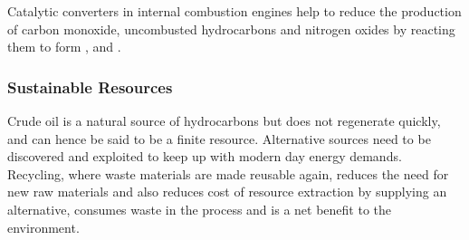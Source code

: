 \documentclass[../main]{subfiles}
\begin{document}
	Catalytic converters in internal combustion engines help to reduce the production of carbon monoxide, uncombusted hydrocarbons and nitrogen oxides by reacting them to form ,  and .

	\subsubsection{Sustainable Resources}

	Crude oil is a natural source of hydrocarbons but does not regenerate quickly, and can hence be said to be a finite resource. Alternative sources need to be discovered and exploited to keep up with modern day energy demands. \\

	Recycling, where waste materials are made reusable again, reduces the need for new raw materials and also reduces cost of resource extraction by supplying an alternative, consumes waste in the process and is a net benefit to the environment.
\end{document}
